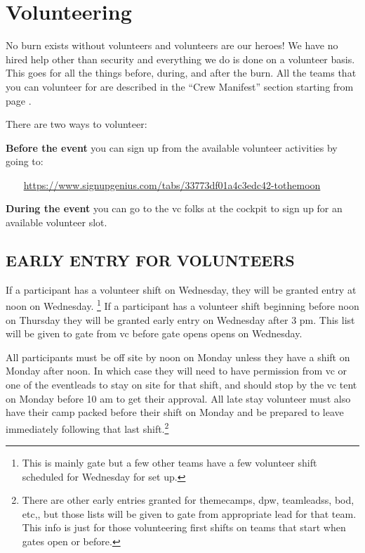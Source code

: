 %
%
%

\chapter{Volunteering}

No burn exists without volunteers and volunteers are our heroes! We have no hired help other than security and everything we do is done on a volunteer basis.  This goes for all the things before, during, and after the burn.  All the teams that you can volunteer for are described in the ``Crew Manifest'' section starting from page \pageref{ch:teams}.

There are two ways to volunteer:

\textbf{Before the event} you can sign up from the available volunteer activities by going to:

{\indent ~~~ \url{https://www.signupgenius.com/tabs/33773df01a4c3edc42-tothemoon} }

\textbf{During the event} you can go to the \gls{vc} folks at the \gls{cockpit} to sign up for an available volunteer slot.

\section*{EARLY ENTRY FOR VOLUNTEERS}

If a participant has a volunteer shift on Wednesday, they will be granted entry at noon on Wednesday. \footnote{This is mainly \gls{gate} but a few other teams have a few volunteer shift scheduled for Wednesday for set up.}  If a participant has a volunteer shift beginning before noon on Thursday they will be granted early entry on Wednesday after 3 pm.  This list will be given to \gls{gate} from \gls{vc} before \gls{gate} opens opens on Wednesday.

All participants must be off site by noon on Monday unless they have a shift on Monday after noon. In which case they will need to have permission from \gls{vc} or one of the \gls{eventleads} to stay on site for that shift, and should stop by the \gls{vc} tent on Monday before 10 am to get their approval. All late stay volunteer must also have their camp packed before their shift on Monday and be prepared to leave immediately following that last shift.\footnote{There are other early entries granted for \glspl{themecamp}, \gls{dpw}, \glspl{teamleads}, \gls{bod}, etc,,  but those lists will be given to \gls{gate} from appropriate lead for that team. This info is just for those volunteering first shifts on teams that start when gates open or before.}


